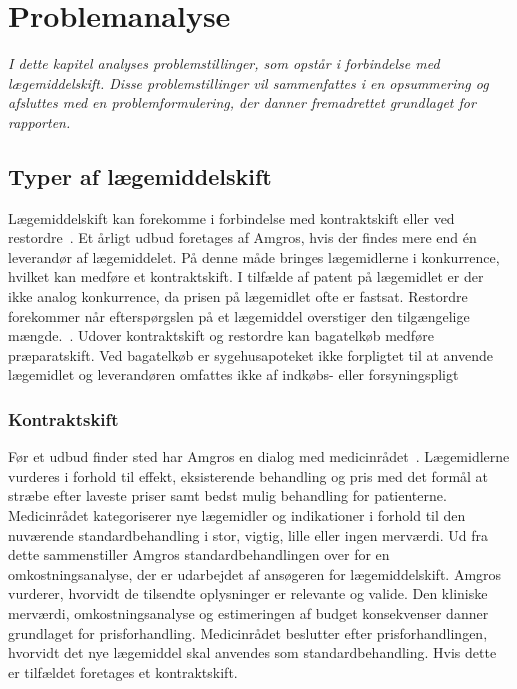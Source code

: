 \chapter{Problemanalyse}
\textit{I dette kapitel analyses problemstillinger, som opstår i forbindelse med lægemiddelskift. Disse problemstillinger vil sammenfattes i en opsummering og afsluttes med en problemformulering, der danner fremadrettet grundlaget for rapporten.}

\section{Typer af lægemiddelskift}
Lægemiddelskift kan forekomme i forbindelse med kontraktskift eller ved restordre~\citep{Amgros2015}. Et årligt udbud foretages af Amgros, hvis der findes mere end én leverandør af lægemiddelet. På denne måde bringes lægemidlerne i konkurrence, hvilket kan medføre et kontraktskift. I tilfælde af patent på lægemidlet er der ikke analog konkurrence, da prisen på lægemidlet ofte er fastsat. Restordre forekommer når efterspørgslen på et lægemiddel overstiger den tilgængelige mængde.~\citep{Amgros2015}. Udover kontraktskift og restordre kan bagatelkøb medføre præparatskift. Ved bagatelkøb er sygehusapoteket ikke forpligtet til at anvende lægemidlet og leverandøren omfattes ikke af indkøbs- eller forsyningspligt~

\subsection{Kontraktskift}
Før et udbud finder sted har Amgros en dialog med medicinrådet~\citep{Amgros2017, Amgros2017a}. Lægemidlerne vurderes i forhold til effekt, eksisterende behandling og pris med det formål at stræbe efter laveste priser samt bedst mulig behandling for patienterne. Medicinrådet kategoriserer nye lægemidler og indikationer i forhold til den nuværende standardbehandling i stor, vigtig, lille eller ingen merværdi. Ud fra dette sammenstiller Amgros standardbehandlingen over for en omkostningsanalyse, der er udarbejdet af ansøgeren for lægemiddelskift. Amgros vurderer, hvorvidt de tilsendte oplysninger er relevante og valide. Den kliniske merværdi, omkostningsanalyse og estimeringen af budget konsekvenser danner grundlaget for prisforhandling. Medicinrådet beslutter efter prisforhandlingen, hvorvidt det nye lægemiddel skal anvendes som standardbehandling. Hvis dette er tilfældet foretages et kontraktskift.~\citep{Amgros2017, Amgros2017a}

